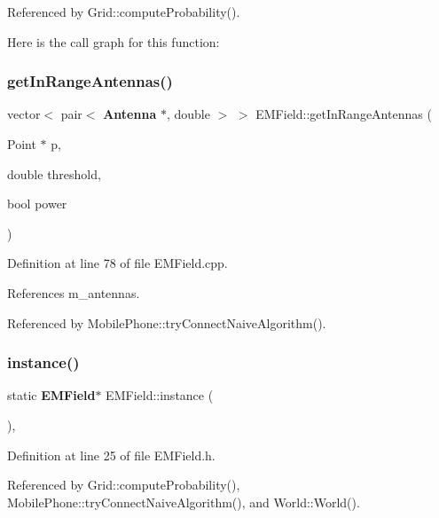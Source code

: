Referenced by Grid\+::compute\+Probability().

Here is the call graph for this function\+:
\mbox{\label{class_e_m_field_a929d0adcb4e69d088209644665a15644}} 
\subsubsection{get\+In\+Range\+Antennas()}
{\footnotesize\ttfamily vector$<$ pair$<$ \textbf{ Antenna} $\ast$, double $>$ $>$ E\+M\+Field\+::get\+In\+Range\+Antennas (\begin{DoxyParamCaption}\item[{Point $\ast$}]{p,  }\item[{double}]{threshold,  }\item[{bool}]{power }\end{DoxyParamCaption})}



Definition at line 78 of file E\+M\+Field.\+cpp.



References m\+\_\+antennas.



Referenced by Mobile\+Phone\+::try\+Connect\+Naive\+Algorithm().

\mbox{\label{class_e_m_field_acbadbede116ac320398cbfcd19e90ec7}} 
\subsubsection{instance()}
{\footnotesize\ttfamily static \textbf{ E\+M\+Field}$\ast$ E\+M\+Field\+::instance (\begin{DoxyParamCaption}{ }\end{DoxyParamCaption})\hspace{0.3cm}{\ttfamily [inline]}, {\ttfamily [static]}}



Definition at line 25 of file E\+M\+Field.\+h.



Referenced by Grid\+::compute\+Probability(), Mobile\+Phone\+::try\+Connect\+Naive\+Algorithm(), and World\+::\+World().

\mbox{\label{class_e_m_field_a724a0875311def27abe0e7ec7932ca41}} 
